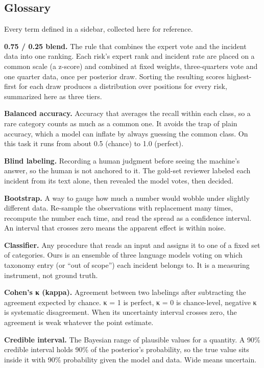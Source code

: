 \documentclass[11pt]{article}
\begin{document}
\subsection{Glossary}\label{glossary}

Every term defined in a sidebar, collected here for reference.

\textbf{0.75 / 0.25 blend.} The rule that combines the expert vote and
the incident data into one ranking. Each risk's expert rank and incident
rate are placed on a common scale (a z-score) and combined at fixed
weights, three-quarters vote and one quarter data, once per posterior
draw. Sorting the resulting scores highest-first for each draw produces
a distribution over positions for every risk, summarized here as three
tiers.

\textbf{Balanced accuracy.} Accuracy that averages the recall within
each class, so a rare category counts as much as a common one. It avoids
the trap of plain accuracy, which a model can inflate by always guessing
the common class. On this task it runs from about 0.5 (chance) to 1.0
(perfect).

\textbf{Blind labeling.} Recording a human judgment before seeing the
machine's answer, so the human is not anchored to it. The gold-set
reviewer labeled each incident from its text alone, then revealed the
model votes, then decided.

\textbf{Bootstrap.} A way to gauge how much a number would wobble under
slightly different data. Re-sample the observations with replacement
many times, recompute the number each time, and read the spread as a
confidence interval. An interval that crosses zero means the apparent
effect is within noise.

\textbf{Classifier.} Any procedure that reads an input and assigns it to
one of a fixed set of categories. Ours is an ensemble of three language
models voting on which taxonomy entry (or ``out of scope'') each
incident belongs to. It is a measuring instrument, not ground truth.

\textbf{Cohen's κ (kappa).} Agreement between two labelings after
subtracting the agreement expected by chance. κ = 1 is perfect, κ = 0 is
chance-level, negative κ is systematic disagreement. When its
uncertainty interval crosses zero, the agreement is weak whatever the
point estimate.

\textbf{Credible interval.} The Bayesian range of plausible values for a
quantity. A 90\% credible interval holds 90\% of the posterior's
probability, so the true value sits inside it with 90\% probability
given the model and data. Wide means uncertain.
\end{document}
